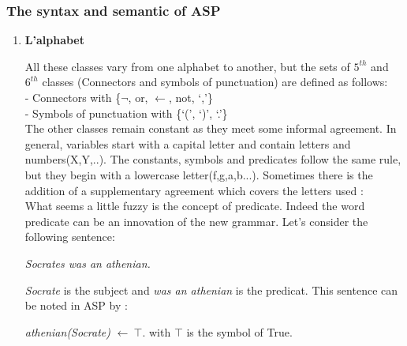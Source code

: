 \subsubsection{The syntax and semantic of ASP}
\label{sectionSyntaxeASP}
\begin{enumerate}
\item \textbf{L'alphabet}

All these classes vary from one alphabet to another, but the sets of $ 5^{th} $ and $ 6^{th} $ classes (Connectors and symbols of punctuation) are defined as follows:\\

- Connectors with \{$\neg$, or, $\leftarrow$, not, ‘,’\} \\
- Symbols of punctuation with \{‘(’, ‘)’, ‘.’\} \\

The other classes remain constant as they meet some informal agreement. In general, variables start with a capital letter and contain letters and numbers(X,Y,..). The constants, symbols and predicates follow the same rule, but they begin with a lowercase letter(f,g,a,b...). Sometimes there is the addition of a supplementary agreement which covers the letters used \cite{baral2003knowledge} : \\

What seems a little fuzzy is the concept of predicate. Indeed the word predicate can be an innovation of the new grammar. Let's consider the following sentence: 
\begin{tabbing}
 \textit{Socrates was an athenian.} 
\end{tabbing}
\textit{Socrate} is the subject and \textit{was an athenian} is the predicat. This sentence can be noted in ASP by :
\begin{tabbing}
 \textit{athenian(Socrate) }$\leftarrow ~ \top$. \hspace{2cm} with $\top$ is the symbol of True.
\end{tabbing} 


\end{enumerate}
